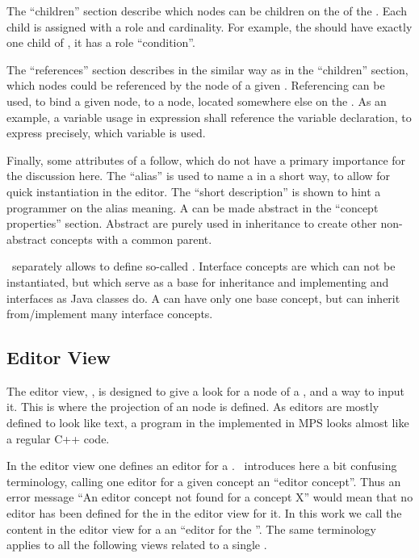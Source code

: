 The ``children'' section describe which nodes can be children on the  of the . Each child is assigned with a role and cardinality. 
For example, the  should have exactly one child of  , it has a role ``condition''.

The ``references'' section describes in the similar way as in the ``children'' section, which nodes could be referenced by the node of a given .
Referencing can be used, to bind a given node, to a node, located somewhere else on the . As an example, a variable usage in expression shall reference
the variable declaration, to express precisely, which variable is used.

Finally, some attributes of a  follow, which do not have a primary importance for the discussion here. The ``alias'' is used to 
name a  in a short way, to allow for quick instantiation in the editor. The ``short description'' is shown to hint a programmer on the
alias meaning. A  can be made abstract in the ``concept properties'' section. Abstract  are purely used in inheritance 
to create other non-abstract concepts with a common parent.

\jbmps\ separately allows to define so-called . Interface concepts are  which can not be instantiated, but 
which serve as a base for inheritance and implementing and interfaces as Java classes do. A  can have only one base concept, but can
inherit from/implement many interface concepts.

\subsection{Editor View}
\label{mpseditor}

The editor view, , is designed to give a look for a node of a , and a way to input it. This is where the projection of an  node is defined. 
As editors are mostly defined to look like text, a program in the \cpppl implemented in MPS looks almost like a regular C++ code.

In the editor view one defines an editor for a . \jbmps\ introduces here a bit confusing terminology, calling one editor for a given
 concept an ``editor concept''. Thus an error message ``An editor concept not found for a concept X'' would mean that no editor
has been defined for the   in the editor view for it. In this work we call the content in the editor view for a   an 
``editor for the  ''. The same terminology applies to all the following views related to a single .

